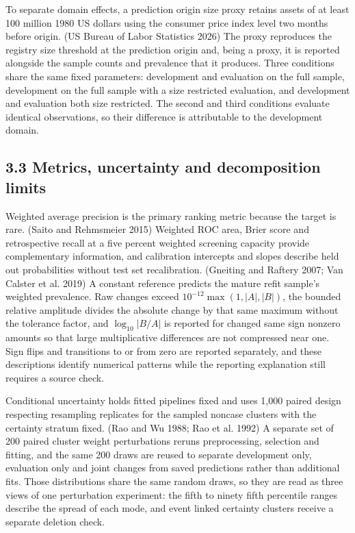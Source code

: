 \documentclass[10pt,a4paper,twocolumn]{article}
\begin{document}
To separate domain effects, a prediction origin size proxy retains assets of at least 100 million 1980 US dollars using the consumer price index level two months before origin. (US Bureau of Labor Statistics 2026) The proxy reproduces the registry size threshold at the prediction origin and, being a proxy, it is reported alongside the sample counts and prevalence that it produces. Three conditions share the same fixed parameters: development and evaluation on the full sample, development on the full sample with a size restricted evaluation, and development and evaluation both size restricted. The second and third conditions evaluate identical observations, so their difference is attributable to the development domain.

\subsection{3.3 Metrics, uncertainty and decomposition limits}

Weighted average precision is the primary ranking metric because the target is rare. (Saito and Rehmsmeier 2015) Weighted ROC area, Brier score and retrospective recall at a five percent weighted screening capacity provide complementary information, and calibration intercepts and slopes describe held out probabilities without test set recalibration. (Gneiting and Raftery 2007; Van Calster et al. 2019) A constant reference predicts the mature refit sample's weighted prevalence. Raw changes exceed $10^{-12}\max(1,|A|,|B|)$, the bounded relative amplitude divides the absolute change by that same maximum without the tolerance factor, and $\log_{10}|B/A|$ is reported for changed same sign nonzero amounts so that large multiplicative differences are not compressed near one. Sign flips and transitions to or from zero are reported separately, and these descriptions identify numerical patterns while the reporting explanation still requires a source check.

Conditional uncertainty holds fitted pipelines fixed and uses 1,000 paired design respecting resampling replicates for the sampled noncase clusters with the certainty stratum fixed. (Rao and Wu 1988; Rao et al. 1992) A separate set of 200 paired cluster weight perturbations reruns preprocessing, selection and fitting, and the same 200 draws are reused to separate development only, evaluation only and joint changes from saved predictions rather than additional fits. Those distributions share the same random draws, so they are read as three views of one perturbation experiment: the fifth to ninety fifth percentile ranges describe the spread of each mode, and event linked certainty clusters receive a separate deletion check.
\end{document}

